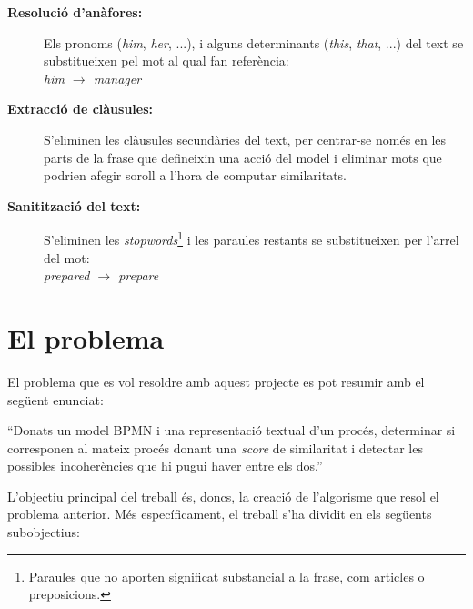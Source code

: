 \begin{description}
\item[\textbf{Resolució d'anàfores:}] Els pronoms (\emph{him}, \emph{her}, ...), i alguns determinants (\emph{this}, \emph{that}, ...) del text se substitueixen pel mot al qual fan referència:\\ \emph{him $\rightarrow$ manager}
\item[\textbf{Extracció de clàusules:}] S'eliminen les clàusules secundàries del text, per centrar-se només en les parts de la frase que defineixin una acció del model i eliminar mots que podrien afegir soroll a l'hora de computar similaritats.
\item[\textbf{Sanitització del text:}] S'eliminen les \emph{stopwords}\footnote{Paraules que no aporten significat substancial a la frase, com articles o preposicions.} i les paraules restants se substitueixen per l'arrel del mot:\\ \emph{prepared $\rightarrow$ prepare}
\end{description}



\section{El problema}
\label{sec:introduccio-el_problema}
El problema que es vol resoldre amb aquest projecte es pot resumir amb el següent enunciat: 

\begin{displayquote}
``Donats un model BPMN i una representació textual d'un procés, determinar si corresponen al mateix procés donant una \emph{score} de similaritat i detectar les possibles incoherències que hi pugui haver entre els dos.''
\end{displayquote}

L'objectiu principal del treball és, doncs, la creació de l'algorisme que resol el problema anterior. Més específicament, el treball s'ha dividit en els següents subobjectius:

